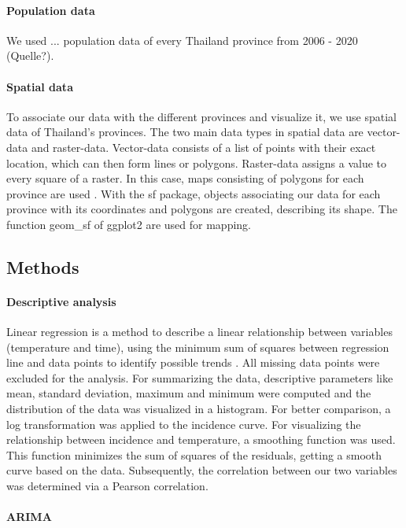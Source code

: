	\paragraph{Population data}
	We used ... population data of every Thailand province from 2006 - 2020 (Quelle?).
	
	\paragraph{Spatial data}
	To associate our data with the different provinces and visualize it, we use spatial data of Thailand’s provinces. The two main data types in spatial data are vector-data and raster-data. Vector-data consists of a list of points with their exact location, which can then form lines or polygons. Raster-data assigns a value to every square of a raster. In this case, maps consisting of polygons for each province are used \citep{sds}. With the sf package, objects associating our data for each province with its coordinates and polygons are created, describing its shape. The function geom\_sf of ggplot2 are used for mapping. 
	
	\subsection{Methods}
	
	\paragraph{Descriptive analysis}
	Linear regression is a method to describe a linear relationship between variables (temperature and time), using the minimum sum of squares between regression line and data points to identify possible trends \citep{Schneider2010}. 
	All missing data points were excluded for the analysis. For summarizing the data, descriptive parameters like mean, standard deviation, maximum and minimum were computed and the distribution of the data was visualized in a histogram. For better comparison, a log transformation was applied to the incidence curve. 
	For visualizing the relationship between incidence and temperature, a smoothing function was used. This function minimizes the sum of squares of the residuals, getting a smooth curve based on the data. Subsequently, the correlation between our two variables was determined via a Pearson correlation.

	
	

	\paragraph{ARIMA}
	
